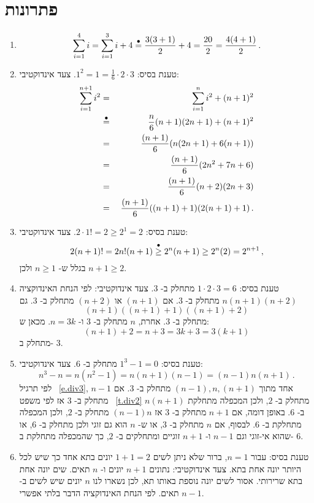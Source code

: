 
\chapter{%
פתרונות%
}\label{a.solutions}

\setlength{\jot}{6pt}

\begin{enumerate}
\item 
\[
\sum_{i=1}^4 i = \sum_{i=1}^3 i + 4 \stackrel{\bullet}{=}{} \frac{3(3+1)}{2} + 4 = \frac{20}{2} = \frac{4(4+1)}{2}\,.
\]

\item
טענת בסיס:
$1^2 = 1 = \frac{1}{6}\cdot 2\cdot 3$.
צעד אינדוקטיבי:
\begin{eqnarray*}
\sum_{i=1}^{n+1} i^2 &=& \sum_{i=1}^n i^2 + (n+1)^2\\
&\stackrel{\bullet}{=}{}& \frac{n}{6}(n+1)(2n+1) + (n+1)^2\\
&=& \frac{(n+1)}{6} (n(2n+1) + 6(n+1))\\
&=& \frac{(n+1)}{6}(2n^2+7n+6)\\
&=& \frac{(n+1)}{6}(n+2)(2n+3)\\
&=& \frac{(n+1)}{6}((n+1)+1)(2(n+1)+1)\,.
\end{eqnarray*}

\item 
טענת בסיס:
$2\cdot 1! = 2 \geq 2^1 = 2$.
צעד אינדוקטיבי:
\[
2(n+1)!=2n!(n+1)\stackrel{\bullet}{\geq}{}2^n(n+1) \geq 2^n(2) = 2^{n+1}\,,
\]
בגלל ש-%
$n\geq 1$
ולכן
$n+1 \geq 2$.

\item
טענת בסיס:
$1\cdot 2 \cdot 3 = 6$
מתחלק ב-%
$3$.
צעד אינדוקטיבי: לפי הנחת האינדוקציה
$n(n+1)(n+2)$
מתחלק ב-%
$3$.
אם
$(n+1)$
או
$(n+2)$
מתחלק ב-%
$3$.
גם 
\[
(n+1)((n+1)+1)((n+1)+2)
\]
מתחלק ב-%
$3$.
אחרת,
$n$
מתחלק ב-%
$3$
ו-%
$n=3k$.
מכאן ש:
\[
(n+1)+2 = n+3=3k+3=3(k+1)
\]
מתחלק ב-%
$3$.

\item
טענת בסיס:
$1^3-1=0$
מתחלק ב-%
$6$.
צעד אינדוקטיבי:
\[
n^3-n=n(n^2-1)=n(n+1)(n-1)=(n-1)n(n+1)\,.
\]
לפי תרגיל~%
\ref{e.div3},
אחד מתוך
$(n-1),n,(n+1)$
מתחלק ב-%
$3$.
אם
$n-1$
מתחלק ב-%
$3$
אז לפי משפט~%
\ref{t.div2} $n(n+1)$
מתחלק ב-%
$2$,
ולכן המכפלה מתחלקת ב-%
$6$.
באופן דומה, אם
$n+1$
מתחלק ב-%
$3$
אז
$(n-1)n$
מתחלק ב-%
$2$,
ולכן המכפלה מתחלקת ב-%
$6$.
לבסוף, אם
$n$
מתחלק ב-%
$3$,
או ש-%
$n$
הוא גם זוגי ולכן מתחלק ב-%
$6$,
או שהוא אי-זוגי וגם
$n-1$
ו-%
$n+1$
זוגיים ומתחלקים ב-%
$2$,
כך שהמכפלה מתחלקת ב-%
$6$.

\item
טענת בסיס: עבור
$n=1$,
ברור שלא ניתן לשים 
$1+1=2$
יונים בתא אחד כך שיש לכל היותר יונה אחת בתא. צעד אינדוקטיבי: נתונים 
$n+1$
יונים ו-%
$n$
תאים. שים יונה אחת בתא שרירותי. אסור לשים יונה נוספת באותו תא, לכן נשארו לנו 
$n$
יונים שיש לשים ב-%
$n-1$
תאים. לפי הנחת האינדוקציה הדבר בלתי אפשרי.


\end{enumerate}
